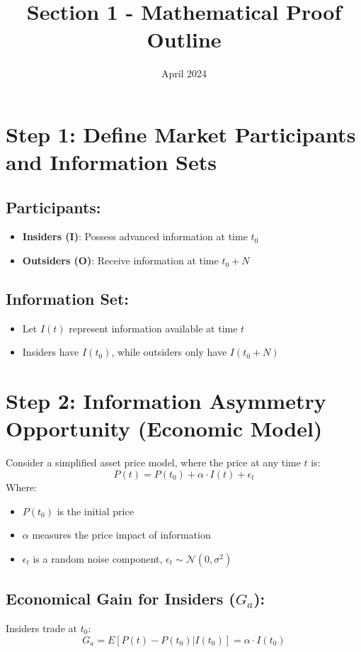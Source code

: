 \documentclass{article}
\title{Section 1 - Mathematical Proof Outline}
\date{April 2024}
\begin{document}

\section{Step 1: Define Market Participants and Information Sets}

\subsection*{Participants:}
\begin{itemize}
    \item \textbf{Insiders (I)}: Possess advanced information at time $t_0$
    \item \textbf{Outsiders (O)}: Receive information at time $t_0 + N$
\end{itemize}

\subsection*{Information Set:}
\begin{itemize}
    \item Let $I(t)$ represent information available at time $t$
    \item Insiders have $I(t_0)$, while outsiders only have $I(t_0 + N)$
\end{itemize}

\section{Step 2: Information Asymmetry Opportunity (Economic Model)}

Consider a simplified asset price model, where the price at any time $t$ is:
\[
P(t) = P(t_0) + \alpha \cdot I(t) + \epsilon_t
\]
Where:
\begin{itemize}
    \item $P(t_0)$ is the initial price
    \item $\alpha$ measures the price impact of information
    \item $\epsilon_t$ is a random noise component, $\epsilon_t \sim \mathcal{N}(0, \sigma^2)$
\end{itemize}

\subsection*{Economical Gain for Insiders ($G_a$):}
Insiders trade at $t_0$:
\[
G_a = E[P(t) - P(t_0) | I(t_0)] = \alpha \cdot I(t_0)
\]
\end{document}
